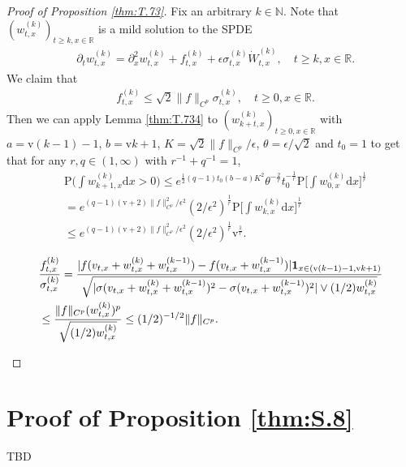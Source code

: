 \documentclass[12pt,a4paper]{amsart}
\numberwithin{equation}{section}
\theoremstyle{plain}
\theoremstyle{remark}
\newenvironment{proof*}[1][\proofname]{
	\renewcommand\qedsymbol{\rule{3mm}{3mm}}
	\begin{proof}[#1]}{\end{proof}}
\begin{document}
\begin{proof}[Proof of Proposition \ref{thm:T.73}]
	Fix an arbitrary $k\in \mathbb N$. 
	Note that $(w^{(k)}_{t,x})_{t\geq k,x\in \mathbb R}$ is a mild solution to the SPDE
\begin{align} 
	& \partial_t w_{t,x}^{(k)}  
	= \partial_x^2 w_{t,x}^{(k)} + f_{t,x}^{(k)} + \epsilon\sigma_{t,x}^{(k)} \dot W_{t,x}^{(k)}, 
	\quad t\geq k, x\in \mathbb R.
\end{align}
	We claim that
\begin{align} \label{eq:T.5}
	& f^{(k)}_{t,x} 
	\leq \sqrt{2}\|f\|_{C^p}\sigma^{(k)}_{t,x}, 
	\quad t\geq 0, x\in \mathbb R.
\end{align}
	Then we can apply Lemma \ref{thm:T.734} to $(w^{(k)}_{k+t,x})_{t\geq 0, x\in \mathbb R}$ with $a = \mathrm v(k-1) - 1$, $b=\mathrm vk  + 1 $, $K =\sqrt{2}\|f\|_{C^p}/\epsilon$, $\theta =\epsilon/\sqrt{2}$ and $t_0 = 1$ to get that for any $r, q\in (1,\infty)$ with $r^{-1}+q^{-1} = 1$,
\begin{align}
	&\mathrm P\Big(\int w^{(k)}_{k+1,x}\mathrm dx>0\Big) 
	\leq e^{\frac{1}{2}(q-1)t_0(b-a)K^2}\theta^{-\frac{2}{r}} t_0^{-\frac{1}{r}} \mathrm P\Big[\int w_{0,x}^{(k)}\mathrm dx\Big]^{\frac{1}{r}}
	\\&= e^{(q-1)(\mathrm v+2) \|f\|_{C^p}^2/\epsilon^2}(2/\epsilon^2)^{\frac{1}{r}} \mathrm P\Big[\int w_{k,x}^{(k)}\mathrm dx\Big]^{\frac{1}{r}}
	\\&\leq e^{(q-1)(\mathrm v+2) \|f\|_{C^p}^2/\epsilon^2}(2/\epsilon^2)^{\frac{1}{r}} \mathrm v^{\frac{1}{r}}.
\end{align}
\begin{proof*}
\begin{align}
& \frac{f^{(k)}_{t,x}}{\sigma^{(k)}_{t,x}} = \frac{|f(v_{t,x}+ w_{t,x}^{(k)} + w_{t,x}^{(k-1)}) - f(v_{t,x}+ w_{t,x}^{(k-1)})| \mathbf 1_{x\in (\mathrm v(k-1) - 1, \mathrm vk  + 1)}}{\sqrt{|\sigma(v_{t,x} + w^{(k)}_{t,x} + w^{(k-1)}_{t,x})^2 - \sigma(v_{t,x} + w^{(k-1)}_{t,x})^2| \vee (1/2) w^{(k)}_{t,x}}} 
\\&\leq \frac{\|f\|_{C^p} (w_{t,x}^{(k)})^p}{\sqrt{(1/2) w_{t,x}^{(k)}}}
\leq (1/2)^{-1/2}\|f\|_{C^p}. \qedhere
\end{align}
\end{proof*}
\end{proof}

\section{Proof of Proposition \ref{thm:S.8}} \label{sec:W}
{\color{blue} TBD}
\end{document}
